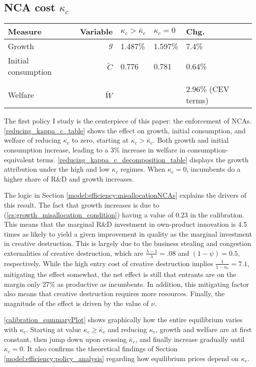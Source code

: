 \documentclass[11pt,english]{article}
\begin{document}
\subsection{NCA cost $\kappa_c$}

\begin{table}
	\centering
	\label{reducing_kappa_c_table}
	\begin{tabular}{lrlll}
		\toprule \toprule
		Measure & Variable & $\kappa_c > \bar{\kappa}_c$ & $\kappa_c = 0$ & Chg. \tabularnewline
		\midrule
		Growth & $g$ & 1.487\% & 1.597\% & 7.4\% \tabularnewline
		Initial consumption & $\tilde{C}$  & 0.776 &  0.781 & 0.64\% \tabularnewline 
		\tabularnewline
		Welfare & $\tilde{W}$  &  & & 2.96\% (CEV terms)  \tabularnewline
		\bottomrule
	\end{tabular}
\end{table}

The first policy I study is the centerpiece of this paper: the enforcement of NCAs. \autoref{reducing_kappa_c_table} shows the effect on growth, initial consumption, and welfare of reducing $\kappa_c$ to zero, starting at $\kappa_c > \bar{\kappa}_c$. Both growth and initial consumption increase, leading to a 3\% increase in welfare in consumption-equivalent terms. \autoref{reducing_kappa_c_decomposition_table} displays the growth attribution under the high and low $\kappa_c$ regimes. When $\kappa_c = 0$, incumbents do a higher share of R\&D and growth increases.

The logic in Section \ref{model:efficiency:misallocationNCAs} explains the drivers of this result. The fact that growth increases is due to (\ref{cs:growth_misallocation_condition}) having a value of 0.23 in the calibration. This means that the marginal R\&D investment in own-product innovation is 4.5 times as likely to yield a given improvement in quality as the marginal investment in creative destruction. This is largely due to the business stealing and congestion externalities of creative destruction, which are $\frac{\lambda - 1}{\lambda} = .08$ and $(1-\psi) = 0.5$, respectively. While the high entry cost of creative destruction implies $\frac{1}{1-\kappa_e} = 7.1$, mitigating the effect somewhat, the net effect is still that entrants are on the margin only 27\% as productive as incumbents. In addition, this mitigating factor also means that creative destruction requires more resources. Finally, the magnitude of the effect is driven by the value of $\nu$.

\autoref{calibration_summaryPlot} shows graphically how the entire equilibrium varies with $\kappa_c$. Starting at value $\kappa_c \ge \bar{\kappa}_c$ and reducing $\kappa_c$, growth and welfare are at first constant, then jump down upon crossing $\bar{\kappa}_c$, and finally increase gradually until $\kappa_c = 0$. It also confirms the theoretical findings of Section \ref{model:efficiency:policy_analysis} regarding how equilibrium prices depend on $\kappa_c$. 
\end{document}
